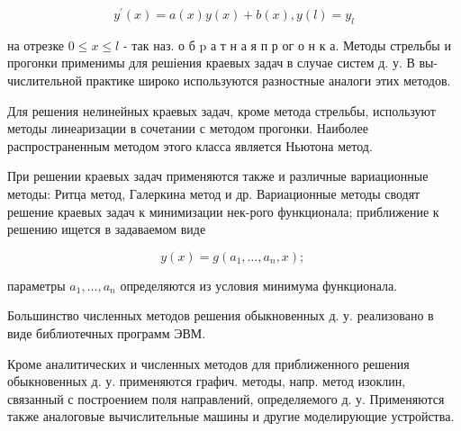 \documentclass[10pt]{article}
\begin{document}
\[

y^{\prime}(x)=a(x) y(x)+b(x), y(l)=y_{l}

\]



на отрезке $0 \leqslant x \leqslant l$ - так наз. о б $\mathrm{p}$ а т н а я п р ог о н к а. Методы стрельбы и прогонки применимы для решіения краевых задач в случае систем д. у. В вы- числительной практике широко используются разностные аналоги этих методов.



Для решения нелинейных краевых задач, кроме метода стрельбы, используют методы линеаризации в сочетании с методом прогонки. Наиболее распространенным методом этого класса является Ньютона метод.



При решении краевых задач применяются также и различные вариационные методы: Ритца метод, Галеркина метод и др. Вариационные методы сводят решение краевых задач к минимизации нек-рого функционала; приближение к решению ищется в задаваемом виде



\[

y(x)=g\left(a_{1}, \ldots, a_{n}, x\right) \text {; }

\]



параметры $a_{1}, \ldots, a_{n}$ определяются из условия минимума функционала.



Большинство численных методов решения обыкновенных д. у. реализовано в виде библиотечных программ ЭВМ.



Кроме аналитических и численных методов для приближенного решения обыкновенных д. у. применяются графич. методы, напр. метод изоклин, связанный с построением поля направлений, определяемого д. у. Применяются также аналоговые вычислительные машины и другие моделирующие устройства.
\end{document}
